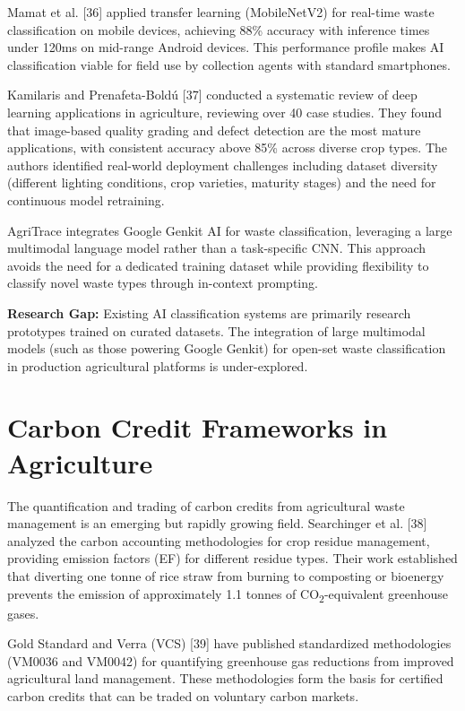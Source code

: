 \documentclass[a4paper,12pt,oneside]{report}
\begin{document}
Mamat et al. [36] applied transfer learning (MobileNetV2) for real-time waste classification on mobile devices, achieving 88\% accuracy with inference times under 120ms on mid-range Android devices. This performance profile makes AI classification viable for field use by collection agents with standard smartphones.

Kamilaris and Prenafeta-Bold{\'u} [37] conducted a systematic review of deep learning applications in agriculture, reviewing over 40 case studies. They found that image-based quality grading and defect detection are the most mature applications, with consistent accuracy above 85\% across diverse crop types. The authors identified real-world deployment challenges including dataset diversity (different lighting conditions, crop varieties, maturity stages) and the need for continuous model retraining.

AgriTrace integrates Google Genkit AI for waste classification, leveraging a large multimodal language model rather than a task-specific CNN. This approach avoids the need for a dedicated training dataset while providing flexibility to classify novel waste types through in-context prompting.

\textbf{Research Gap:} Existing AI classification systems are primarily research prototypes trained on curated datasets. The integration of large multimodal models (such as those powering Google Genkit) for open-set waste classification in production agricultural platforms is under-explored.

\section{Carbon Credit Frameworks in Agriculture}

\noindent The quantification and trading of carbon credits from agricultural waste management is an emerging but rapidly growing field. Searchinger et al. [38] analyzed the carbon accounting methodologies for crop residue management, providing emission factors (EF) for different residue types. Their work established that diverting one tonne of rice straw from burning to composting or bioenergy prevents the emission of approximately 1.1 tonnes of CO\textsubscript{2}-equivalent greenhouse gases.

Gold Standard and Verra (VCS) [39] have published standardized methodologies (VM0036 and VM0042) for quantifying greenhouse gas reductions from improved agricultural land management. These methodologies form the basis for certified carbon credits that can be traded on voluntary carbon markets.
\end{document}
